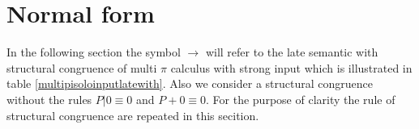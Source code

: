 % 
% 

\section{Normal form}

In the following section the symbol $\rightarrow$ will refer to the late semantic with structural congruence of multi $\pi$ calculus with strong input which is illustrated in table \ref{multipisoloinputlatewith}. Also we consider a structural congruence without the rules $P|0\equiv 0$ and $P+0\equiv 0$. For the purpose of clarity the rule of structural congruence are repeated in this secition.


